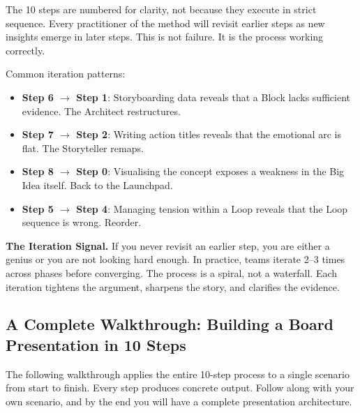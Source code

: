The 10 steps are numbered for clarity, not because they execute in strict sequence. Every practitioner of the method will revisit earlier steps as new insights emerge in later steps. This is not failure. It is the process working correctly.

Common iteration patterns:

\begin{itemize}
  \item \textbf{Step 6 $\rightarrow$ Step 1}: Storyboarding data reveals that a Block lacks sufficient evidence. The Architect restructures.
  \item \textbf{Step 7 $\rightarrow$ Step 2}: Writing action titles reveals that the emotional arc is flat. The Storyteller remaps.
  \item \textbf{Step 8 $\rightarrow$ Step 0}: Visualising the concept exposes a weakness in the Big Idea itself. Back to the Launchpad.
  \item \textbf{Step 5 $\rightarrow$ Step 4}: Managing tension within a Loop reveals that the Loop sequence is wrong. Reorder.
\end{itemize}

\begin{diagnosisbox}
\textbf{The Iteration Signal.} If you never revisit an earlier step, you are either a genius or you are not looking hard enough. In practice, teams iterate 2--3 times across phases before converging. The process is a spiral, not a waterfall. Each iteration tightens the argument, sharpens the story, and clarifies the evidence.
\end{diagnosisbox}


\subsection{A Complete Walkthrough: Building a Board Presentation in 10 Steps}
The following walkthrough applies the entire 10-step process to a single scenario from start to finish. Every step produces concrete output. Follow along with your own scenario, and by the end you will have a complete presentation architecture.

